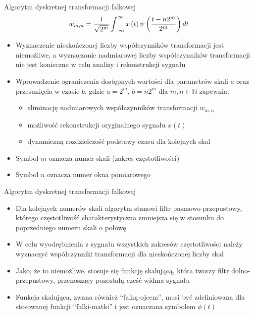 \documentclass[12pt, polish, aspectratio = 169]{beamer}
\begin{document}
\begin{frame}{Algorytm dyskretnej transformacji falkowej}
\begin{equation}
w_{m,n} = \frac{1}{\sqrt{2^{m}}} \int _{-\infty} ^{\infty} x \left(t\right) \psi \left(\frac{t - n 2^{m}}{2^{m}}\right) dt \label{eq:dwt}
\end{equation}
\begin{itemize}
\item Wyznaczenie nieskończonej liczby współczynników transformacji jest niemożliwe, a wyznaczanie nadmiarowej liczby współczynników transformacji nie jest konieczne w celu analizy i rekonstrukcji sygnału
\item Wprowadzenie ograniczenia dostępnych wartości dla parametrów skali $a$ oraz przesunięcia w czasie $b$, gdzie $a = 2^m$, $b = n2^m$ dla $m, n \in \mathbb{N}$ zapewnia:
	\begin{itemize}
	\item eliminację nadmiarowych współczynników transformacji $w_{m,n}$
	\item możliwość rekonstrukcji oryginalnego sygnału $x(t)$
	\item dynamiczną rozdzielczość podstawy czasu dla kolejnych skal
	\end{itemize}
\item Symbol $m$ oznacza numer skali (zakres częstotliwości)
\item Symbol $n$ oznacza numer okna pomiarowego
\end{itemize}
\end{frame}

\begin{frame}{Algorytm dyskretnej transformacji falkowej}
\begin{itemize}
\item Dla kolejnych numerów skali algorytm stanowi filtr pasmowo-przepustowy, którego częstotliwość charakterystyczna zmniejsza się w stosunku do poprzedniego numeru skali o połowę
\item W celu wyodrębnienia z sygnału wszystkich zakresów częstotliwości należy wyznaczyć współczynniki transformacji dla nieskończonej liczby skal
\item Jako, że to niemożliwe, stosuje się funkcję skalującą, która tworzy filtr dolno-przepustowy, przenoszący pozostałą cześć widma sygnału
\item Funkcja skalująca, zwana również \enquote{falką-ojcem}, musi być zdefiniowana dla stosowanej funkcji \enquote{falki-matki} i jest oznaczana symbolem $\phi(t)$
\end{itemize}
\end{frame}
\end{document}
